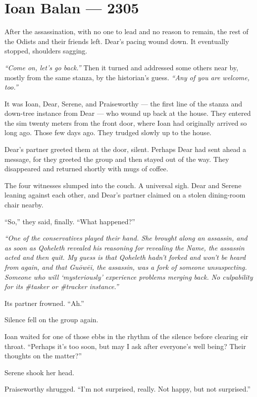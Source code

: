 \hypertarget{ioan-balan-2305}{%
\chapter*{Ioan Balan — 2305}\label{ioan-balan-2305}}

After the assassination, with no one to lead and no reason to remain, the rest of the Odists and their friends left. Dear's pacing wound down. It eventually stopped, shoulders sagging.

\emph{``Come on, let's go back.''} Then it turned and addressed some others near by, mostly from the same stanza, by the historian's guess. \emph{``Any of you are welcome, too.''}

It was Ioan, Dear, Serene, and Praiseworthy — the first line of the stanza and down-tree instance from Dear — who wound up back at the house. They entered the sim twenty meters from the front door, where Ioan had originally arrived so long ago. Those few days ago. They trudged slowly up to the house.

Dear's partner greeted them at the door, silent. Perhaps Dear had sent ahead a message, for they greeted the group and then stayed out of the way. They disappeared and returned shortly with mugs of coffee.

The four witnesses slumped into the couch. A universal sigh. Dear and Serene leaning against each other, and Dear's partner claimed on a stolen dining-room chair nearby.

``So,'' they said, finally. ``What happened?''

\emph{``One of the conservatives played their hand. She brought along an assassin, and as soon as Qoheleth revealed his reasoning for revealing the Name, the assassin acted and then quit. My guess is that Qoheleth hadn't forked and won't be heard from again, and that Guōwēi, the assassin, was a fork of someone unsuspecting. Someone who will `mysteriously' experience problems merging back. No culpability for its \#tasker or \#tracker instance.''}

Its partner frowned. ``Ah.''

Silence fell on the group again.

Ioan waited for one of those ebbs in the rhythm of the silence before clearing eir throat. ``Perhaps it's too soon, but may I ask after everyone's well being? Their thoughts on the matter?''

Serene shook her head.

Praiseworthy shrugged. ``I'm not surprised, really. Not happy, but not surprised.''

